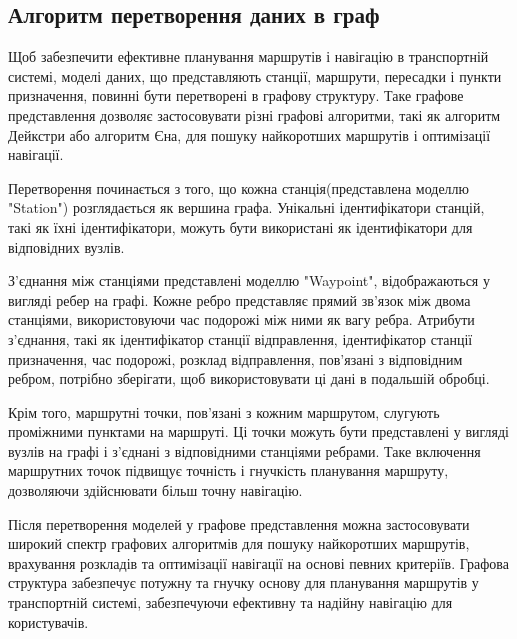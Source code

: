 \subsection{Алгоритм перетворення даних в граф}
\label{subsec:models-to-graph}

Щоб забезпечити ефективне планування маршрутів і навігацію в транспортній системі, моделі даних, що представляють станції, маршрути, пересадки і пункти призначення, повинні бути перетворені в графову структуру. Таке графове представлення дозволяє застосовувати різні графові алгоритми, такі як алгоритм Дейкстри або алгоритм Єна, для пошуку найкоротших маршрутів і оптимізації навігації.

Перетворення починається з того, що кожна станція(представлена моделлю "Station") розглядається як вершина графа. Унікальні ідентифікатори станцій, такі як їхні ідентифікатори, можуть бути використані як ідентифікатори для відповідних вузлів.

З'єднання між станціями представлені моделлю "Waypoint", відображаються у вигляді ребер на графі. Кожне ребро представляє прямий зв'язок між двома станціями, використовуючи час подорожі між ними як вагу ребра. Атрибути з'єднання, такі як ідентифікатор станції відправлення, ідентифікатор станції призначення, час подорожі, розклад відправлення, пов'язані з відповідним ребром, потрібно зберігати, щоб використовувати ці дані в подальшій обробці.

Крім того, маршрутні точки, пов'язані з кожним маршрутом, слугують проміжними пунктами на маршруті. Ці точки можуть бути представлені у вигляді вузлів на графі і з'єднані з відповідними станціями ребрами. Таке включення маршрутних точок підвищує точність і гнучкість планування маршруту, дозволяючи здійснювати більш точну навігацію.

Після перетворення моделей у графове представлення можна застосовувати широкий спектр графових алгоритмів для пошуку найкоротших маршрутів, врахування розкладів та оптимізації навігації на основі певних критеріїв. Графова структура забезпечує потужну та гнучку основу для планування маршрутів у транспортній системі, забезпечуючи ефективну та надійну навігацію для користувачів.

